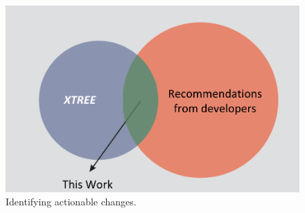 \begin{figure}
\includegraphics[width=\linewidth]{venn.png}
\caption{Identifying actionable changes.}
\label{fig:xtree}
\end{figure}
